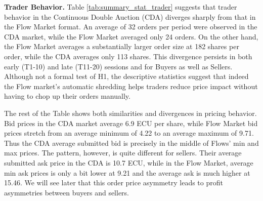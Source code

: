 \noindent \textbf{Trader Behavior.} 
Table \ref{tab:summary_stat_trader} suggests that trader behavior in the Continuous Double Auction (CDA) 
diverges sharply from that in the Flow Market format. 
An average of 32 orders per period were observed in the CDA market, while the Flow Market averaged only 24 orders. %
On the other hand, the Flow Market averages a substantially larger order size at 182 shares per order, while the CDA averages only 113 shares. This divergence persists in both early (T1-10) and late (T11-20) sessions and for Buyers as well as Sellers. Although not a formal test of H1, the descriptive statistics suggest that indeed the Flow market's automatic shredding helps traders reduce price impact without having to chop up their orders manually.  

The rest of the Table shows both similarities and divergences in pricing behavior. 
Bid prices in the CDA market average 6.9 ECU per share, while Flow Market bid prices stretch from an average minimum of 4.22 to an average maximum of 9.71. Thus the CDA average submitted bid is precisely in the middle of Flows' min and max prices. The pattern, however, is quite different for sellers. Their average submitted ask price in the CDA is 10.7 ECU, while in the Flow Market, average min ask prices is only a bit lower at 9.21 and the average ask is much higher at 15.46. 
We will see later that this order price asymmetry 
leads to profit asymmetries between buyers and sellers. 




